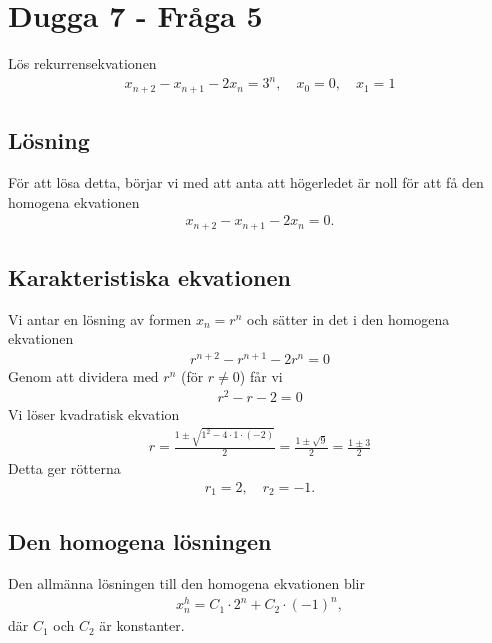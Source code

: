 \documentclass[a4paper,12pt]{article}
\begin{document}
%
\section*{Dugga 7 - Fråga 5}
Lös rekurrensekvationen
\begin{align}
    x_{n+2} - x_{n+1} - 2x_n = 3^n, \quad x_0 = 0, \quad x_1 = 1
\end{align}
%
\subsection*{Lösning}
För att lösa detta, börjar vi med att anta att högerledet är noll för att få den homogena ekvationen
\begin{align}
    x_{n+2} - x_{n+1} - 2x_n = 0.
\end{align}
%
\subsection*{Karakteristiska ekvationen}
Vi antar en lösning av formen $x_n = r^n$ och sätter in det i den homogena ekvationen
\begin{align}
    r^{n+2} - r^{n+1} - 2r^n = 0
\end{align}
Genom att dividera med $r^n$ (för $r \neq 0$) får vi
\begin{align}
    r^2 - r - 2 = 0
\end{align}
Vi löser kvadratisk ekvation
\begin{align}
    r = \frac{1 \pm \sqrt{1^2 - 4 \cdot 1 \cdot (-2)}}{2} = \frac{1 \pm \sqrt{9}}{2} = \frac{1 \pm 3}{2}
\end{align}
Detta ger rötterna
\begin{align}
    r_1 = 2, \quad r_2 = -1.
\end{align}
%
\subsection*{Den homogena lösningen}
Den allmänna lösningen till den homogena ekvationen blir
\begin{align}
    x_n^h = C_1 \cdot 2^n + C_2 \cdot (-1)^n,
\end{align}
där $C_1$ och $C_2$ är konstanter.
%
\end{document}
